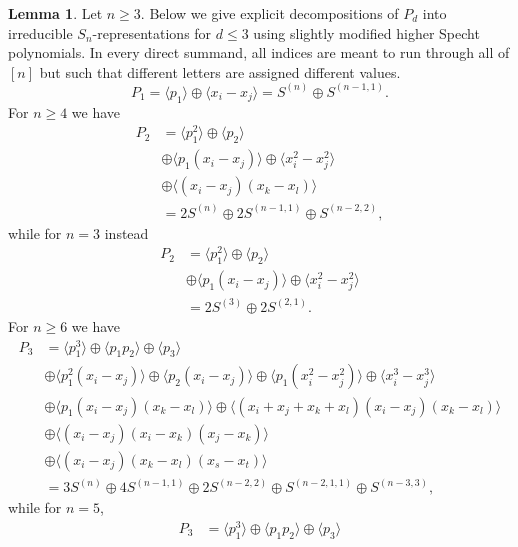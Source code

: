 \documentclass[11pt]{amsart}
\theoremstyle{definition}
\newtheorem{lemma}[theorem]{Lemma}
\begin{document}
\begin{lemma}\label{lem:classification}
    Let $n \geq 3$. Below we give explicit decompositions of $P_d$ into irreducible $S_n$-representations for $d \leq 3$ using slightly modified higher Specht polynomials. In every direct summand, all indices are meant to run through all of $[n]$ but such that different letters are assigned different values.
    \begin{equation*}
        P_1 = \langle p_1 \rangle  \oplus  \langle x_i - x_j \rangle = S^{(n)} \oplus S^{(n-1,1)}.
    \end{equation*}
    For $n \geq 4$ we have
    \begin{align*}
        P_2 &= \langle p_1^2 \rangle \oplus \langle p_2 \rangle \\
        &\oplus \langle p_1(x_i - x_j) \rangle \oplus \langle x_i^2 - x_j^2 \rangle \\
        &\oplus \langle (x_i - x_j)(x_k - x_l) \rangle \\
        &= 2S^{(n)} \oplus 2S^{(n-1,1)} \oplus S^{(n-2,2)},
    \end{align*}
    while for $n=3$ instead
    \begin{align*}
        P_2 &= \langle p_1^2 \rangle \oplus \langle p_2 \rangle \\
        &\oplus \langle p_1(x_i - x_j) \rangle \oplus \langle x_i^2 - x_j^2 \rangle \\
        &= 2S^{(3)} \oplus 2S^{(2,1)}.
    \end{align*}
    For $n \geq 6$ we have
    \begin{align*}
        P_3 &= \langle p_1^3 \rangle \oplus \langle p_1 p_2 \rangle \oplus \langle p_3 \rangle \\
        &\oplus \langle p_1^2(x_i - x_j) \rangle \oplus \langle p_2(x_i - x_j) \rangle \oplus \langle p_1(x_i^2 - x_j^2) \rangle \oplus \langle x_i^3 - x_j^3 \rangle \\
        &\oplus \langle p_1(x_i-x_j)(x_k-x_l) \rangle \oplus \langle (x_i+x_j+x_k+x_l)(x_i-x_j)(x_k-x_l) \rangle \\
        &\oplus \langle (x_i-x_j)(x_i-x_k)(x_j-x_k) \rangle \\
        &\oplus \langle (x_i-x_j)(x_k-x_l)(x_s-x_t) \rangle \\
        &= 3S^{(n)} \oplus 4S^{(n-1,1)} \oplus 2S^{(n-2,2)} \oplus S^{(n-2,1,1)} \oplus S^{(n-3,3)},
    \end{align*}
    while for $n=5$,
    \begin{align*}
        P_3 &= \langle p_1^3 \rangle \oplus \langle p_1 p_2 \rangle \oplus \langle p_3 \rangle \\

\end{align*}
\end{lemma}
\end{document}
